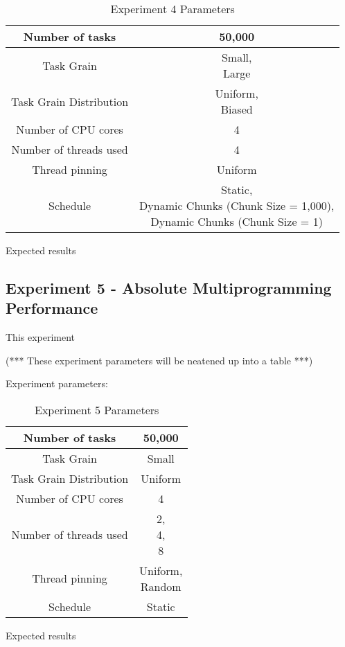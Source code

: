 \begin{table}
\centering
	\begin{tabular}{|c|c|}
		\hline
		Number of tasks & 50,000 \\
		\hline
		Task Grain & \specialcell{Small, \\ Large} \\
		\hline
		Task Grain Distribution & \specialcell{Uniform, \\ Biased} \\
		\hline
		Number of CPU cores & 4 \\
		\hline
		Number of threads used & 4 \\
		\hline
		Thread pinning & Uniform \\
		\hline
		Schedule & \specialcell{Static, \\ Dynamic Chunks (Chunk Size = 1,000), \\ Dynamic Chunks (Chunk Size = 1)} \\
		\hline
	\end{tabular}
\caption{Experiment 4 Parameters}
\label{table:ex4_parameters}
\end{table}



Expected results



\subsection{Experiment 5 - Absolute Multiprogramming Performance}

This experiment



(*** These experiment parameters will be neatened up into a table ***)

Experiment parameters:

\begin{table}
\centering
	\begin{tabular}{|c|c|}
		\hline
		Number of tasks & 50,000 \\
		\hline
		Task Grain & Small \\
		\hline
		Task Grain Distribution & Uniform \\
		\hline
		Number of CPU cores & 4 \\
		\hline
		Number of threads used & \specialcell{2, \\ 4, \\ 8} \\
		\hline
		Thread pinning & \specialcell{Uniform, \\ Random} \\
		\hline
		Schedule & Static \\
		\hline
	\end{tabular}
\caption{Experiment 5 Parameters}
\label{table:ex5_parameters}
\end{table}



Expected results